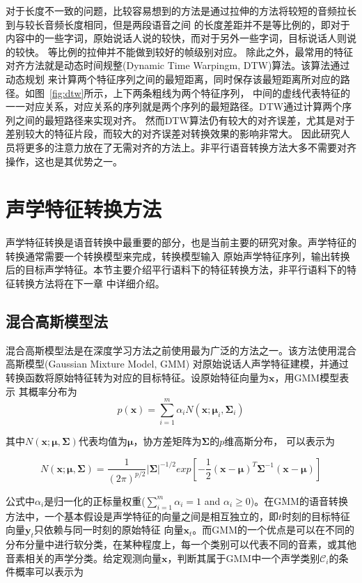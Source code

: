 对于长度不一致的问题，比较容易想到的方法是通过拉伸的方法将较短的音频拉长到与较长音频长度相同，但是两段语音之间
的长度差距并不是等比例的，即对于内容中的一些字词，原始说话人说的较快，而对于另外一些字词，目标说话人则说的较快。
等比例的拉伸并不能做到较好的帧级别对应。
除此之外，最常用的特征对齐方法就是动态时间规整(Dynamic Time Warpingm, DTW)算法。该算法通过动态规划
来计算两个特征序列之间的最短距离，同时保存该最短距离所对应的路径。如图~\ref{fig:dtw}所示，上下两条粗线为两个特征序列，
中间的虚线代表特征的一一对应关系，对应关系的序列就是两个序列的最短路径。DTW通过计算两个序列之间的最短路径来实现对齐。
然而DTW算法仍有较大的对齐误差，尤其是对于差别较大的特征片段，而较大的对齐误差对转换效果的影响非常大。
因此研究人员将更多的注意力放在了无需对齐的方法上。非平行语音转换方法大多不需要对齐操作，这也是其优势之一。

\section{声学特征转换方法}
声学特征转换是语音转换中最重要的部分，也是当前主要的研究对象。声学特征的转换通常需要一个转换模型来完成，转换模型输入
原始声学特征序列，输出转换后的目标声学特征。本节主要介绍平行语料下的特征转换方法，非平行语料下的特征转换方法将在下一章
中详细介绍。

\subsection{混合高斯模型法}
混合高斯模型法是在深度学习方法之前使用最为广泛的方法之一。该方法使用混合高斯模型(Gaussian Mixture Model, GMM)
对原始说话人声学特征建模，并通过转换函数将原始特征转为对应的目标特征。设原始特征向量为$\mathbf{x}$，用GMM模型表示
其概率分布为
\begin{equation}
    \label{eq:gmm}
    p(\mathbf{x})=\sum^{m}_{i=1}\alpha_iN(\mathbf{x};\bm{\mu}_i,\bm{\Sigma}_i)
\end{equation}

其中$N(\mathbf{x};\bm{\mu},\bm{\Sigma})$代表均值为$\bm{\mu}$，协方差矩阵为$\bm{\Sigma}$的$p$维高斯分布，
可以表示为

\begin{equation}
    N(\mathbf{x};\bm{\mu},\bm{\Sigma})=\frac{1}{(2\pi)^{p/2}}\left| \bm{\Sigma} \right|^{-1/2} exp\left[ -\frac{1}{2}(\mathbf{x}-\bm{\mu})^{T}\bm{\Sigma}^{-1}(\mathbf{x}-\bm{\mu}) \right]
\end{equation}

公式中$\alpha_i$是归一化的正标量权重($\sum^{m}_{i=1}\alpha_i=1$ and $\alpha_i \ge 0$)。在GMM的语音转换
方法中，一个基本假设是声学特征的向量之间是相互独立的，即$t$时刻的目标特征向量$\mathbf{y}_t$只依赖与同一时刻的原始特征
向量$\mathbf{x}_t$。而GMM的一个优点是可以在不同的分布分量中进行软分类，在某种程度上，每一个类别可以代表不同的音素，或其他
音素相关的声学分类。给定观测向量$\mathbf{x}$，判断其属于GMM中一个声学类别$\mathcal{C}_i$的条件概率可以表示为

